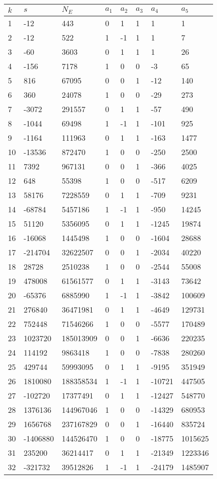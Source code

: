 \documentclass{amsart}
\begin{document}
\begin{longtable}{|l|l|l|lllll|}
\hline
$k$ & $s$ & $N_E$ & $a_1$ & $a_2$ & $a_3$ & $a_4$ & $a_5$\\
\hline
1&-12&443&0&1&1&1&1\\
2&-12&522&1&-1&1&1&7\\
3&-60&3603&0&1&1&1&26\\
4&-156&7178&1&0&0&-3&65\\
5&816&67095&0&0&1&-12&140\\
6&360&24078&1&0&0&-29&273\\
7&-3072&291557&0&1&1&-57&490\\
8&-1044&69498&1&-1&1&-101&925\\
9&-1164&111963&0&1&1&-163&1477\\
10&-13536&872470&1&0&0&-250&2500\\
11&7392&967131&0&0&1&-366&4025\\
12&648&55398&1&0&0&-517&6209\\
13&58176&7228559&0&1&1&-709&9231\\
14&-68784&5457186&1&-1&1&-950&14245\\
15&51120&5356095&0&1&1&-1245&19874\\
16&-16068&1445498&1&0&0&-1604&28688\\
17&-214704&32622507&0&0&1&-2034&40220\\
18&28728&2510238&1&0&0&-2544&55008\\
19&478008&61561577&0&1&1&-3143&73642\\
20&-65376&6885990&1&-1&1&-3842&100609\\
21&276840&36471981&0&1&1&-4649&129731\\
22&752448&71546266&1&0&0&-5577&170489\\
23&1023720&185013909&0&0&1&-6636&220235\\
24&114192&9863418&1&0&0&-7838&280260\\
25&429744&59993095&0&1&1&-9195&351949\\
26&1810080&188358534&1&-1&1&-10721&447505\\
27&-102720&17377491&0&1&1&-12427&548770\\
28&1376136&144967046&1&0&0&-14329&680953\\
29&1656768&237167829&0&0&1&-16440&835724\\
30&-1406880&144526470&1&0&0&-18775&1015625\\
31&235200&36214417&0&1&1&-21349&1223346\\
32&-321732&39512826&1&-1&1&-24179&1485907\\

\end{longtable}
\end{document}
